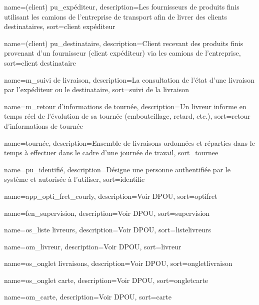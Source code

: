 {
	name={(client) pu\_expéditeur},
	description={Les fournisseurs de produits finis utilisant les camions de l'entreprise de transport afin de livrer des clients destinataires},
	sort={client expéditeur}
}

{
	name={(client) pu\_destinataire},
	description={Client recevant des produits finis provenant d'un fournisseur (client expéditeur) via les camions de l'entreprise},
	sort={client destinataire}
}

{
	name={m\_suivi de livraison},
	description={La consultation de l'état d'une livraison par l'expéditeur ou le destinataire},
	sort={suivi de la livraison}
}

{
	name={m\_retour d'informations de tournée},
	description={Un livreur informe en temps réel de l'évolution de sa tournée (embouteillage, retard, etc.)},
	sort={retour d'informations de tournée}
}

{
	name={tournée},
	description={Ensemble de livraisons ordonnées et réparties dans le temps à effectuer dans le cadre d'une journée de travail},
	sort={tournee}
}

{
	name={pu\_identifié},
	description={Désigne une personne authentifiée par le système et autorisée à l'utiliser},
	sort={identifie}
}

{
	name={app\_opti\_fret\_courly},
	description={Voir \textsc{DPOU}},
	sort={optifret}
}

{
	name={fen\_supervision},
	description={Voir \textsc{DPOU}},
	sort={supervision}
}

{
	name={os\_liste livreurs},
	description={Voir \textsc{DPOU}},
	sort={listelivreurs}
}

{
	name={om\_livreur},
	description={Voir \textsc{DPOU}},
	sort={livreur}
}

{
	name={os\_onglet livraisons},
	description={Voir \textsc{DPOU}},
	sort={ongletlivraison}
}

{
	name={os\_onglet carte},
	description={Voir \textsc{DPOU}},
	sort={ongletcarte}
}

{
	name={om\_carte},
	description={Voir \textsc{DPOU}},
	sort={carte}
}


